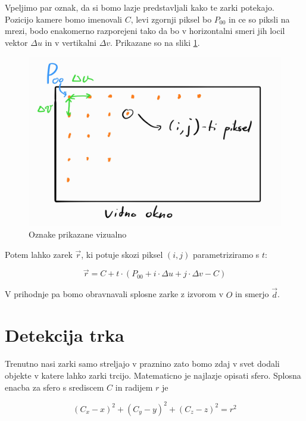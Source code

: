\documentclass[12pt, a4paper]{article}
\begin{document}
Vpeljimo par oznak, da si bomo lazje predstavljali kako te zarki potekajo. Pozicijo kamere bomo imenovali $C$,
levi zgornji piksel bo $P_{00}$ in ce so piksli na mrezi, bodo enakomerno razporejeni tako da bo v horizontalni
smeri jih locil vektor $\Delta u$ in v vertikalni $\Delta v$. Prikazane so na sliki \ref{fig:oznake}.

\begin{figure}[h]
	\centering
	\includegraphics[width=\textwidth]{vidno_okno}
	\caption{Oznake prikazane vizualno}
	\label{fig:oznake}
\end{figure}

Potem lahko zarek $\vec{r}$, ki potuje skozi piksel $(i,j)$ parametriziramo s $t$:

\begin{equation}
	\vec{r} = C + t \cdot (P_{00} + i \cdot \Delta u + j \cdot \Delta v - C)
\end{equation}

V prihodnje pa bomo obravnavali splosne zarke z izvorom v $O$ in smerjo $\vec{d}$.

\section{Detekcija trka}

Trenutno nasi zarki samo streljajo v praznino zato bomo zdaj v svet dodali objekte v katere lahko zarki trcijo.
Matematicno je najlazje opisati sfero. Splosna enacba za sfero s srediscem $C$ in radijem $r$ je

\begin{equation}
	\label{eq:sfera}
	(C_{x} - x)^2  + (C_{y} - y)^2  + (C_{z} - z)^2  = r^2
\end{equation}
\end{document}
